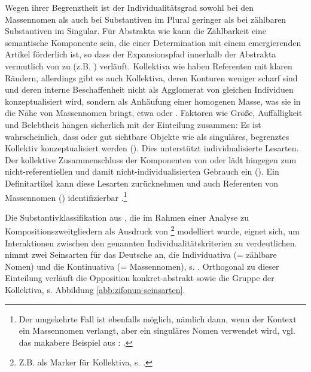 Wegen ihrer Begrenztheit ist der Individualitätsgrad sowohl bei den Massennomen als auch bei Substantiven im Plural geringer als bei zählbaren Substantiven im Singular. Für Abstrakta wie  kann die Zählbarkeit eine semantische Komponente sein, die einer Determination mit einem emergierenden Artikel förderlich ist, so dass der Expansionspfad innerhalb der Abstrakta vermutlich von  zu  (z.B. ) verläuft. Kollektiva wie  haben Referenten mit klaren Rändern, allerdings gibt es auch Kollektiva, deren Konturen weniger scharf sind und deren interne Beschaffenheit nicht als Agglomerat von gleichen Individuen konzeptualisiert wird, sondern als Anhäufung einer homogenen Masse, was sie in die Nähe von Massennomen bringt, etwa  oder  \parencite[s.][120f.]{Zifonun2012}. 
Faktoren wie Größe, Auffälligkeit und Belebtheit hängen sicherlich mit der Einteilung zusammen: Es ist wahrscheinlich, dass  oder gut sichtbare Objekte wie  als singuläres, begrenztes Kollektiv konzeptualisiert werden (). Dies unterstützt individualisierte Lesarten. Der kollektive Zusammenschluss der Komponenten von  oder  lädt hingegen zum nicht-referentiellen und damit nicht-individualisierten Gebrauch ein (). Ein Definitartikel kann diese Lesarten zurücknehmen und auch Referenten von Massennomen () identifizierbar .\footnote{Der umgekehrte Fall ist ebenfalls möglich, nämlich dann, wenn der Kontext ein Massennomen verlangt, aber ein singuläres Nomen verwendet wird, vgl. das makabere Beispiel aus \textcite[81]{Corbett2000}: .} 

Die Substantivklassifikation aus \textcite[104]{Zifonun2012}, die im Rahmen einer Analyse zu Kompositionszweitgliedern als Ausdruck von \footnote{Z.B. als Marker für Kollektiva, s. \textcite[101]{Zifonun2012}.} modelliert wurde, eignet sich, um  Interaktionen zwischen den genannten Individualitätskriterien zu verdeutlichen. \textcite[103]{Zifonun2012} nimmt zwei Seinsarten für das Deutsche an, die Individuativa (= zählbare Nomen) und die Kontinuativa (= Massennomen), s.  \parencite[basierend auf][]{Rijkhoff1991,Rijkhoff2002}. Orthogonal zu dieser Einteilung verläuft die Opposition konkret-abstrakt sowie die Gruppe der Kollektiva, s. Abbildung \ref{abb:zifonun-seinsarten}.

